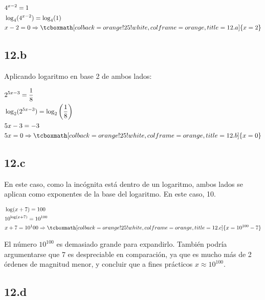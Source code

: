 \documentclass{article}
\newcommand{\hresult}[2]{\tcboxmath[colback=orange!25!white,colframe=orange, title=#1] {#2} }
\begin{document}
\begin{subequations}
\begin{align}
& 4^{x - 2} = 1 \\
& \log_4(4^{x-2}) = \log_4(1) \\
& x - 2 = 0 \Rightarrow \hresult{12.a} { x = 2 }
\end{align}
\end{subequations}

\subsection*{12.b}
\label{subsec:12.b}

Aplicando logaritmo en base 2 de ambos lados:

\begin{subequations}
\begin{align}
& 2^{5x - 3} = \frac{1}{8} \\
& \log_2( 2^{5x - 3} ) = \log_2 \left( \frac{1}{8} \right) \\
& 5x-3 = - 3 \\
& 5x = 0 \Rightarrow \hresult{12.b}{ x = 0 }
\end{align}
\end{subequations}

\subsection*{12.c}
\label{subsec:12.c}

En este caso, como la incógnita está dentro de un logaritmo, ambos lados se aplican como exponentes de la base del logaritmo. En este caso, 10.

\begin{subequations}
\begin{align}
& \log(x + 7) = 100 \\
& 10^{\log(x + 7)} = 10^{100} \\
& x + 7 = 10^100 \Rightarrow \hresult{12.c}{ x = 10^{100} - 7 }
\end{align}
\end{subequations}

El número $10^100$ es demasiado grande para expandirlo. También podría argumentarse que 7 es despreciable en comparación, ya que es mucho más de 2 órdenes de magnitud menor, y concluir que a fines prácticos $x \approx 10^{100} $.

\subsection*{12.d}
\label{subsec:12.d}
\end{document}
